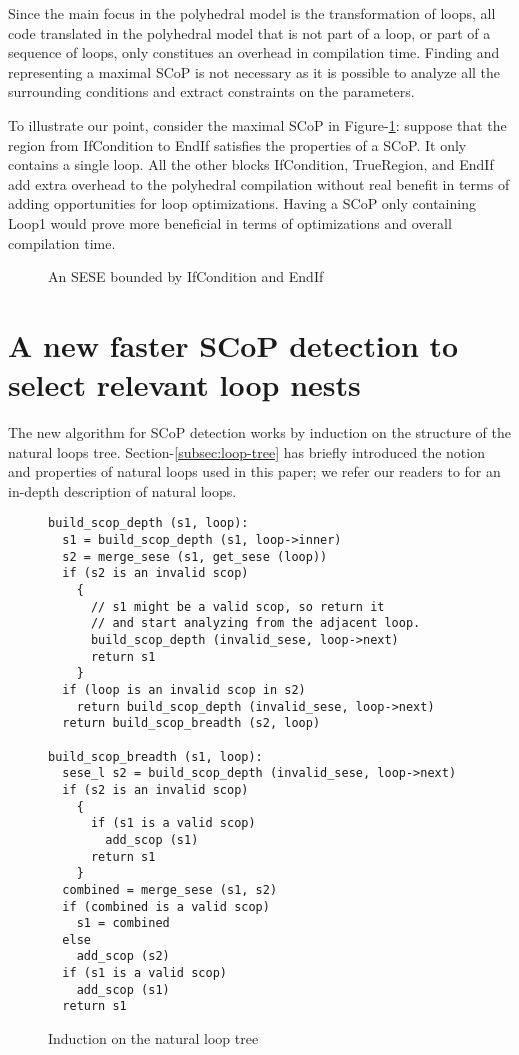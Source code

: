 \documentclass{sigplanconf}
\begin{document}
Since the main focus in the polyhedral model is the transformation of loops, all
code translated in the polyhedral model that is not part of a loop, or part of a
sequence of loops, only constitues an overhead in compilation time.  Finding and
representing a maximal SCoP is not necessary as it is possible to analyze all
the surrounding conditions and extract constraints on the parameters.

To illustrate our point, consider the maximal SCoP in
Figure-\ref{fig:maximality}: suppose that the region from IfCondition to EndIf
satisfies the properties of a SCoP.  It only contains a single loop.  All the
other blocks IfCondition, TrueRegion, and EndIf add extra overhead to the
polyhedral compilation without real benefit in terms of adding opportunities for
loop optimizations.  Having a SCoP only containing Loop1 would prove more
beneficial in terms of optimizations and overall compilation time.

\begin{figure}
\centering
\caption{An SESE bounded by IfCondition and EndIf}
\label{fig:maximality}
\end{figure}

\section{A new faster SCoP detection to select relevant loop nests}
The new algorithm for SCoP detection works by induction on the structure of the
natural loops tree.  Section-\ref{subsec:loop-tree} has briefly introduced
the notion and properties of natural loops used in this paper; we refer our
readers to \cite{dragonbook} for an in-depth description of natural loops.

\begin{figure}
\begin{verbatim}
build_scop_depth (s1, loop):
  s1 = build_scop_depth (s1, loop->inner)
  s2 = merge_sese (s1, get_sese (loop))
  if (s2 is an invalid scop)
    {
      // s1 might be a valid scop, so return it
      // and start analyzing from the adjacent loop.
      build_scop_depth (invalid_sese, loop->next)
      return s1
    }
  if (loop is an invalid scop in s2)
    return build_scop_depth (invalid_sese, loop->next)
  return build_scop_breadth (s2, loop)

build_scop_breadth (s1, loop):
  sese_l s2 = build_scop_depth (invalid_sese, loop->next)
  if (s2 is an invalid scop)
    {
      if (s1 is a valid scop)
        add_scop (s1)
      return s1
    }
  combined = merge_sese (s1, s2)
  if (combined is a valid scop)
    s1 = combined
  else
    add_scop (s2)
  if (s1 is a valid scop)
    add_scop (s1)
  return s1
\end{verbatim}
\caption{Induction on the natural loop tree}
\label{fig:induction}
\end{figure}
\end{document}
